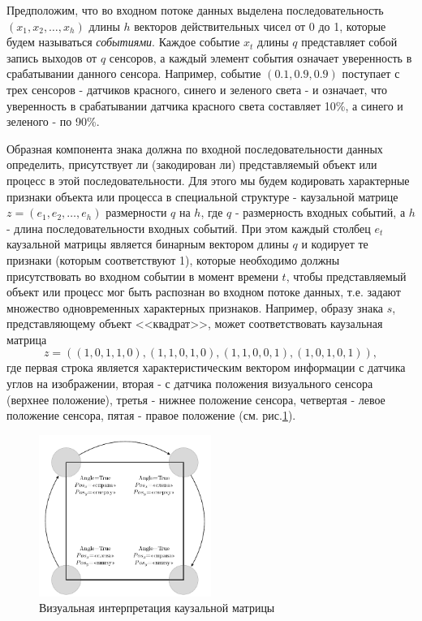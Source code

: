 \documentclass[12pt]{scrartcl}
\begin{document}
	Предположим, что во входном потоке данных выделена последовательность $(x_1,x_2,\dots,x_h)$ длины $h$ векторов действительных чисел от 0 до 1, которые будем называться \textit{событиями}. Каждое событие $x_t$ длины $q$ представляет собой запись выходов от $q$ сенсоров, а каждый элемент события означает уверенность в срабатывании данного сенсора. Например, событие $(0.1, 0.9, 0.9)$ поступает с трех сенсоров - датчиков красного, синего и зеленого света - и означает, что уверенность в срабатывании датчика красного света составляет 10\%, а синего и зеленого - по 90\%.
	
	Образная компонента знака должна по входной последовательности данных определить, присутствует ли (закодирован ли) представляемый объект или процесс в этой последовательности. Для этого мы будем кодировать характерные признаки объекта или процесса в специальной структуре - каузальной матрице $z=(e_1,e_2,\dots,e_h)$ размерности $q$ на $h$, где $q$ - размерность входных событий, а $h$ - длина последовательности входных событий. При этом каждый столбец $e_t$ каузальной матрицы является бинарным вектором длины $q$ и кодирует те признаки (которым соответствуют 1), которые необходимо должны присутствовать во входном событии в момент времени $t$, чтобы представляемый объект или процесс мог быть распознан во входном потоке данных, т.е. задают множество одновременных характерных признаков. Например, образу знака $s$, представляющему объект <<квадрат>>, может соответствовать каузальная матрица 	\[z=((1,0,1,1,0),(1,1,0,1,0),(1,1,0,0,1),(1,0,1,0,1)),\]
	где первая строка является характеристическим вектором информации с датчика углов на изображении, вторая - с датчика положения визуального сенсора (верхнее положение), третья - нижнее положение сенсора, четвертая - левое положение сенсора, пятая - правое положение (см. рис.\ref{fig:square}).

	\begin{figure}
		\label{fig:square}
		\centering
		\includegraphics[width=0.5\textwidth]{examples/recognition/square}
		\caption{Визуальная интерпретация каузальной матрицы}		
	\end{figure}
\end{document}
